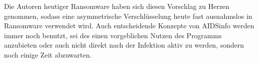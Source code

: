 		Die Autoren heutiger Ransomware haben sich diesen Vorschlag zu Herzen genommen, sodass eine asymmetrische Verschlüsselung heute fast ausnahmslos in Ransomware
		verwendet wird. Auch entscheidende Konzepte von AIDSinfo werden immer noch benutzt, sei des einen vorgeblichen Nutzen des Programms anzubieten oder auch nicht
		direkt nach der Infektion aktiv zu werden, sondern noch einige Zeit abzuwarten.